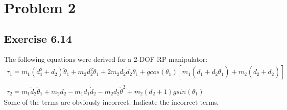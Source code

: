 \documentclass[10pt]{article}
\begin{document}
\section*{Problem 2}
\subsection*{Exercise 6.14}
The following equations were derived for a 2-DOF RP manipulator:
\[
\begin{array}{l}
    \tau_{1} = m_{1}(d^{2}_{1} + d_{2})\ddot{\theta}_1 + 
				m_{2} d^{2}_{2}\ddot{\theta}_{1} + 
				2m_{2}d_{2}\dot{d}_{2}\dot{\theta}_{1} +
				g cos(\theta_{1})[m_{1}(d_{1} + d_{2}\dot{\theta}_{1}) + m_{2}(d_{2} + \dot{d}_{2})]\\ \\
    \tau_{2} = m_{1}\dot{d}_{2}\ddot{\theta}_{1} + m_{2}\ddot{d}_{2} - m_{1}d_{1}\dot{d}_2 - m_{2}d_{2}\dot{\theta}^2 + m_{2}(d_{2} + 1)g sin(\theta_{1})
\end{array}
\]
Some of the terms are obviously incorrect. Indicate the incorrect terms.
\end{document}
